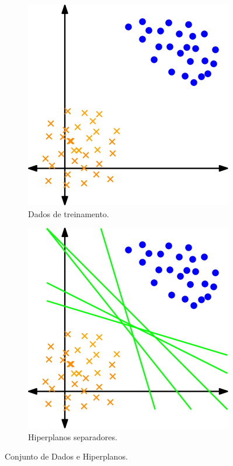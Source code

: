 \documentclass[12pt,a4paper]{scrartcl}
\theoremstyle{definition}%
\begin{document}
\begin{figure}[htbp] 
	\centering
	\begin{subfigure}[h]{0.38\textwidth}
		\centering
		\includegraphics[width=\textwidth]{dados_treinamento}
		\caption{Dados de treinamento. \label{fig:dados_e_hiperplanos:dados_treinamento}}
	\end{subfigure}
	\begin{subfigure}[h]{0.38\textwidth}
		\centering
		\includegraphics[width=\textwidth]{hiperplanos_separadores}
		\caption{Hiperplanos separadores. \label{fig:dados_e_hiperplanos:hiperplanos_separadores}}
	\end{subfigure}
\caption{Conjunto de Dados e Hiperplanos. \label{fig:dados_e_hiperplanos}}
\end{figure}
\end{document}
